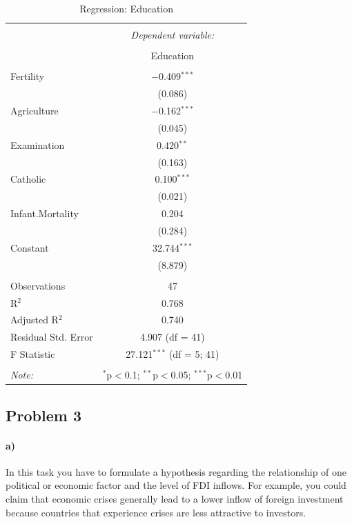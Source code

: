 \documentclass[12pt]{article}\usepackage[]{graphicx}\usepackage[]{color}
\begin{document}
\begin{table}[!htbp] \centering 
  \caption{Regression: Education} 
  \label{} 
\begin{tabular}{@{\extracolsep{5pt}}lc} 
\\[-1.8ex]\hline 
\hline \\[-1.8ex] 
 & \multicolumn{1}{c}{\textit{Dependent variable:}} \\ 
\cline{2-2} 
\\[-1.8ex] & Education \\ 
\hline \\[-1.8ex] 
 Fertility & $-$0.409$^{***}$ \\ 
  & (0.086) \\ 
  Agriculture & $-$0.162$^{***}$ \\ 
  & (0.045) \\ 
  Examination & 0.420$^{**}$ \\ 
  & (0.163) \\ 
  Catholic & 0.100$^{***}$ \\ 
  & (0.021) \\ 
  Infant.Mortality & 0.204 \\ 
  & (0.284) \\ 
  Constant & 32.744$^{***}$ \\ 
  & (8.879) \\ 
 \hline \\[-1.8ex] 
Observations & 47 \\ 
R$^{2}$ & 0.768 \\ 
Adjusted R$^{2}$ & 0.740 \\ 
Residual Std. Error & 4.907 (df = 41) \\ 
F Statistic & 27.121$^{***}$ (df = 5; 41) \\ 
\hline 
\hline \\[-1.8ex] 
\textit{Note:}  & \multicolumn{1}{r}{$^{*}$p$<$0.1; $^{**}$p$<$0.05; $^{***}$p$<$0.01} \\ 
\end{tabular} 
\end{table}

\subsection*{Problem 3}

\paragraph{a)} In this task you have to formulate a hypothesis regarding the relationship of one political or economic factor and the level of FDI inflows. For example, you could claim that economic crises generally lead to a lower inflow of foreign investment because countries that experience crises are less attractive to investors.
\end{document}
